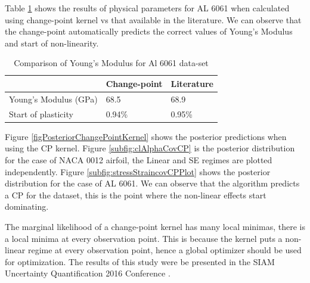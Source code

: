 Table \ref{tabComparisonOfYoungModulus6061Data} shows the results of physical parameters for AL 6061 when calculated using change-point kernel vs that available in the literature. We can observe that the change-point automatically predicts the correct values of Young's Modulus and start of non-linearity.


\begin{table}[!h]
    \centering
\begin{tabular}{|l|l|l|}
  \hline
    & Change-point & Literature \\
  \hline 
  \hline
Young's Modulus (GPa) &  68.5 & 68.9\\
Start of plasticity  & 0.94\% & 0.95\%\\
   \hline
\end{tabular}
\caption{Comparison of Young's Modulus for Al 6061 data-set}
  \label{tabComparisonOfYoungModulus6061Data}
\end{table}

Figure \ref{figPosteriorChangePointKernel} shows the posterior predictions when using the CP kernel. Figure \ref{subfig:clAlphaCovCP} is the posterior distribution for the case of NACA 0012 airfoil, the Linear and SE regimes are plotted independently. Figure \ref{subfig:stressStraincovCPPlot} shows the posterior distribution for the case of AL 6061. We can observe that the algorithm predicts a CP for the dataset, this is the point where the non-linear effects start dominating. 

The marginal likelihood of a change-point kernel has many local minimas, there is a local minima at every observation point. This is because the kernel puts a non-linear regime at every observation point, hence a global optimizer should be used for optimization. The results of this study were be presented in the SIAM Uncertainty Quantification 2016 Conference \cite{chiplunkar:hal-01555401}.

